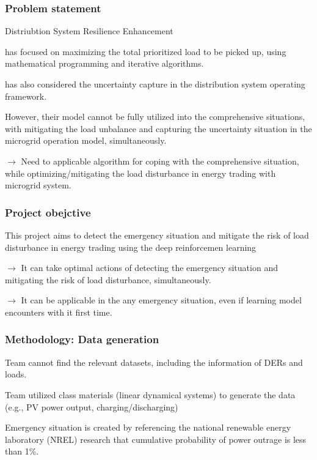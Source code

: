 \documentclass{beamer}
\begin{document}
\begin{frame}
\frametitle{Problem statement}
Distriubtion System Resilience Enhancement
\bit 
\item has focused on maximizing the total prioritized load to be picked up, using mathematical programming and iterative algorithms.
\item has also considered the uncertainty capture in the distribution system operating framework. 
\item However, their model cannot be fully utilized into the comprehensive situations, with mitigating the load unbalance and capturing the uncertainty situation in the microgrid operation model, simultaneously. 
\eit 

\pause
\bigskip
$\rightarrow$ Need to applicable algorithm for coping with the comprehensive situation, while optimizing/mitigating the load disturbance in energy trading with microgrid system. 

\end{frame}



\begin{frame}
\frametitle{Project obejctive}


\begin{block}{}
    \centering
    This project aims to detect the emergency situation and mitigate the risk of load disturbance in energy trading using the deep reinforcemen learning
\end{block}

\bigskip
$\rightarrow$ It can take optimal actions of detecting the emergency situation and mitigating the risk of load disturbance, simultaneously. 
\bigskip

$\rightarrow$ It can be applicable in the any emergency situation, even if learning model encounters with it first time. 

\end{frame}

\begin{frame}
\frametitle{Methodology: Data generation}
\bit
\item Team cannot find the relevant datasets, including the information of DERs and loads.
\item Team utilized class materials (linear dynamical systems) to generate the data (e.g., PV power output, charging/discharging) 
\item Emergency situation is created by referencing the national renewable energy laboratory (NREL) research that cumulative probability of power outrage is less than 1\%. 
\eit

\end{frame}
\end{document}
